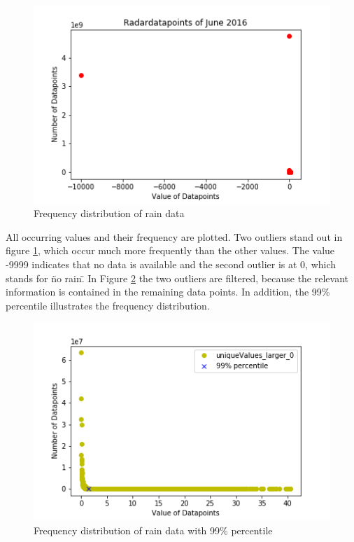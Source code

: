 \documentclass[oneside]{htwg-report}
\begin{document}
\begin{figure}[ht]
    \centering
    \includegraphics[width=1\linewidth,angle=0]{../abb/Radardatapoints_of_June_2016.png}
    \caption[Datenaufbereitung]{Frequency distribution of rain data}
    \label{fig:Radardatapoints_of_June_2016}
\end{figure}

All occurring values and their frequency are plotted. 
Two outliers stand out in figure \ref{fig:Radardatapoints_of_June_2016}, which occur much more frequently than the other values. 
The value -9999 indicates that no data is available and the second outlier is at 0, which stands for \"no rain\". 
In Figure \ref{fig:Radardatapoints_of_June_2016_larger0_99percentile} the two outliers are filtered, because the relevant information is contained in the remaining data points.
In addition, the 99\% percentile illustrates the frequency distribution. 

\begin{figure}[ht]
    \centering
    \includegraphics[width=1\linewidth,angle=0]{../abb/Radardatapoints_of_June_2016_larger0_99percentile.png}
    \caption[Datenaufbereitung]{Frequency distribution of rain data with 99\% percentile}
    \label{fig:Radardatapoints_of_June_2016_larger0_99percentile}
\end{figure}
\end{document}
